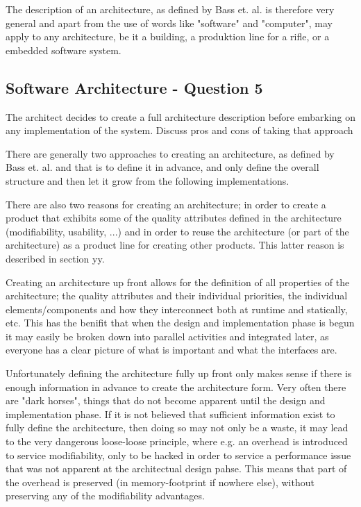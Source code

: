 The description of an architecture, as defined by Bass et. al. is therefore very general and apart from the use of words like "software" and "computer", may apply to any architecture, be it a building, a produktion line for a rifle, or a embedded software system.

\subsection{Software Architecture - Question 5}

\begin{question}
The architect decides to create a full architecture
description before embarking on any implementation of the
system. Discuss pros and cons of taking that approach
\end{question}

There are generally two approaches to creating an architecture, as defined by Bass et. al. and that is to define it in advance, and only define the overall structure and then let it grow from the following implementations. 

There are also two reasons for creating an architecture; in order to create a product that exhibits some of the quality attributes defined in the architecture (modifiability, usability, ...) and in order to reuse the architecture (or part of the architecture) as a product line for creating other products. This latter reason is described in section yy.

Creating an architecture up front allows for the definition of all properties of the architecture; the quality attributes and their individual priorities, the individual elements/components and how they interconnect both at runtime and statically, etc. This has the benifit that when the design and implementation phase is begun it may easily be broken down into parallel activities and integrated later, as everyone has a clear picture of what is important and what the interfaces are.

Unfortunately defining the architecture fully up front only makes sense if there is enough information in advance to create the architecture form. Very often there are "dark horses", things that do not become apparent until the design and implementation phase. If it is not believed that sufficient information exist to fully define the architecture, then doing so may not only be a waste, it may lead to the very dangerous loose-loose principle, where e.g. an overhead is introduced to service modifiability, only to be hacked in order to service a performance issue that was not apparent at the architectual design pahse. This means that part of the overhead is preserved (in memory-footprint if nowhere else), without preserving any of the modifiability advantages.

